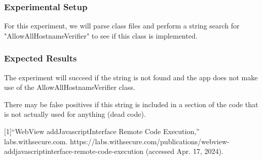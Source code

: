 \documentclass[10pt,twocolumn,pdftex]{article}
\begin{document}
    \subsubsection{Experimental Setup}
    For this experiment, we will parse class files and perform a string search for "AllowAllHostnameVerifier" to see if this class is implemented.
    
    \subsubsection{Expected Results}
    The experiment will succeed if the string is not found and the app does not make use of the AllowAllHostnameVerifier class.
    
    There may be false positives if this string is included in a section of the code that is not actually used for anything (dead code).



[1]“WebView addJavascriptInterface Remote Code Execution,” labs.withsecure.com. https://labs.withsecure.com/publications/webview-addjavascriptinterface-remote-code-execution (accessed Apr. 17, 2024).
‌
\end{document}
